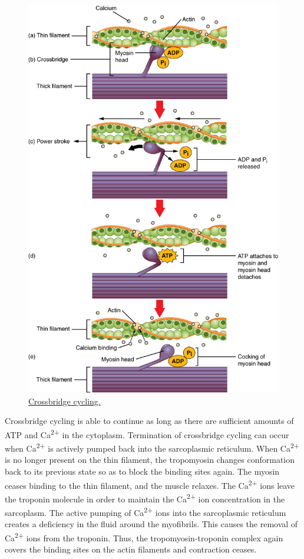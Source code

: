 \begin{figure}

{\centering \includegraphics[width=0.7\linewidth]{./figures/locomotion/1008_Skeletal_Muscle_Contraction} 

}

\caption{\href{https://upload.wikimedia.org/wikipedia/commons/2/24/1008_Skeletal_Muscle_Contraction.jpg}{Crossbridge cycling.}}\label{fig:crossbridge}
\end{figure}

Crossbridge cycling is able to continue as long as there are sufficient amounts of ATP and Ca\textsuperscript{2+} in the cytoplasm. Termination of crossbridge cycling can occur when Ca\textsuperscript{2+} is actively pumped back into the sarcoplasmic reticulum. When Ca\textsuperscript{2+} is no longer present on the thin filament, the tropomyosin changes conformation back to its previous state so as to block the binding sites again. The myosin ceases binding to the thin filament, and the muscle relaxes. The Ca\textsuperscript{2+} ions leave the troponin molecule in order to maintain the Ca\textsuperscript{2+} ion concentration in the sarcoplasm. The active pumping of Ca\textsuperscript{2+} ions into the sarcoplasmic reticulum creates a deficiency in the fluid around the myofibrils. This causes the removal of Ca\textsuperscript{2+} ions from the troponin. Thus, the tropomyosin-troponin complex again covers the binding sites on the actin filaments and contraction ceases.

